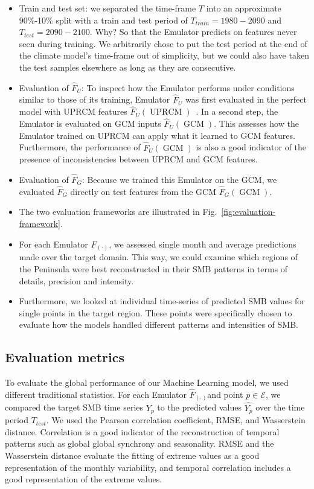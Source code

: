 \documentclass[a4paper,11pt,oneside]{report}
\begin{document}
\begin{itemize}
    \item Train and test set: we separated the time-frame $T$ into an approximate 90\%-10\% split with a train and test period of $T_{train} = 1980-2090$ and $T_{test} = 2090-2100$. Why? So that the Emulator predicts on features never seen during training.
    We arbitrarily chose to put the test period at the end of the climate model's time-frame out of simplicity, but we could also have taken the test samples elsewhere as long as they are consecutive. 
    \item Evaluation of $\hat{F}_U$: To inspect how the Emulator performs under conditions similar to those of its training, Emulator $\hat{F}_U$ was first evaluated in the perfect model with UPRCM features $\hat{F}_U(\operatorname{UPRCM})$~\cite{Doury}. In a second step, the Emulator is evaluated on GCM inputs $\hat{F}_U(\operatorname{GCM})$. This assesses how the Emulator trained on UPRCM can apply what it learned to GCM features. Furthermore, the performance of $\hat{F}_U(\operatorname{GCM})$ is also a good indicator of the presence of inconsistencies between UPRCM and GCM features. 
    \item Evaluation of $\hat{F}_G$: Because we trained this Emulator on the GCM, we evaluated $\hat{F}_G$ directly on test features from the GCM $\hat{F}_G(\operatorname{GCM})$. 
    \item The two evaluation frameworks are illustrated in Fig.~\ref{fig:evaluation-framework}.
    \item For each Emulator $\hat{F}_{(\cdot)}$, we assessed single month and average predictions made over the target domain. This way, we could examine which regions of the Peninsula were best reconstructed in their SMB patterns in terms of details, precision and intensity. \item Furthermore, we looked at individual time-series of predicted SMB values for single points in the target region. These points were specifically chosen to evaluate how the models handled different patterns and intensities of SMB.   
\end{itemize}

\subsection{Evaluation metrics}\label{subsec:evaluation-metrics} 

To evaluate the global performance of our Machine Learning model, we used different traditional statistics. For each Emulator $\hat{F}_{(\cdot)}$and point $p \in \mathcal{E}$, we compared the target SMB time series $Y_{p}$ to the predicted values $\widehat{Y_{p}}$ over the time period $T_{test}$. We used the Pearson correlation coefficient, RMSE, and Wasserstein distance. Correlation is a good indicator of the reconstruction of temporal patterns such as global global synchrony and seasonality. RMSE and the Wasserstein distance evaluate the fitting of extreme values as a good representation of the monthly variability, and temporal correlation includes a good representation of the extreme values. 
\end{document}
